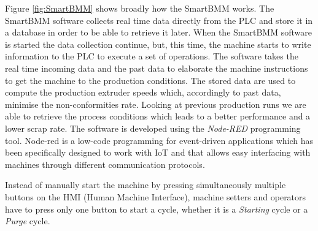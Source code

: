 Figure \ref{fig:SmartBMM} shows broadly how the SmartBMM works. The SmartBMM software collects real time data directly from the PLC and store it in a database in order to be able to retrieve it later. When the SmartBMM software is started the data collection continue, but, this time, the machine starts to write information to the PLC to execute a set of operations. The software takes the real time incoming data and the past data to elaborate the machine instructions to get the machine to the production conditions. The stored data are used to compute the production extruder speeds which, accordingly to past data, minimise the non-conformities rate. Looking at previous production runs we are able to retrieve the process conditions which leads to a better performance and a lower scrap rate. The software is developed using the \textit{Node-RED} \citep{nodered} programming tool. Node-red is a low-code programming for event-driven applications which has been specifically designed to work with IoT and that allows easy interfacing with machines through different communication protocols.

Instead of manually start the machine by pressing simultaneously multiple buttons on the HMI (Human Machine Interface), machine setters and operators have to press only one button to start a cycle, whether it is a \textit{Starting} cycle or a \textit{Purge} cycle.  

